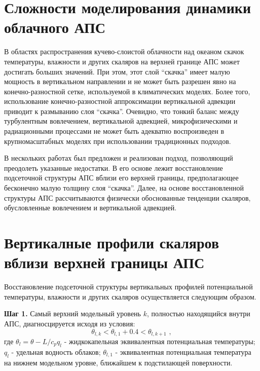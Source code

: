 \documentclass[12pt]{article}
\begin{document}
\section{Сложности моделирования динамики облачного АПС}

В областях распространения кучево-слоистой облачности над океаном скачок температуры, влажности и других скаляров на верхней границе АПС может достигать больших значений. При этом, этот слой ``скачка'' имеет малую мощность в вертикальном направлении и не может быть разрешен явно на конечно-разностной сетке, используемой в климатических моделях. Более того, использование конечно-разностной аппроксимации вертикальной адвекции приводит к размыванию слоя ``скачка''. Очевидно, что тонкий баланс между турбулентным вовлечением, вертикальной адвекцией, микрофизическими и радиационными процессами не может быть адекватно воспроизведен в крупномасштабных моделях при использовании традиционных подходов.

В нескольких работах был предложен и реализован подход, позволяющий преодолеть указанные недостатки. В его основе лежит восстановление подсеточной структуры АПС вблизи его верхней границы, предполагающее бесконечно малую толщину слоя ``скачка''. Далее, на основе восстановленной структуры АПС рассчитываются физически обоснованные тенденции скаляров, обусловленные вовлечением и вертикальной адвекцией.

\section{Вертикалные профили скаляров вблизи верхней границы АПС}

Восстановление подсеточной структуры вертикальных профилей потенциальной температуры, влажности и других скаляров осуществляется следующим образом. 

{\bf Шаг 1.} Самый верхний модельный уровень $k$, полностью находящийся внутри АПС, диагносцируется исходя из условия:
\begin{equation}
\theta_{l,k} < \theta_{l,1} + 0.4 < \theta_{l,k+1}\,\, ,
\end{equation}
где $\theta_l = \theta - L/c_p q_l$ - жидкокапельная эквивалентная потенциальная температуры; $q_l$ - удельная водность облаков; $\theta_{l,1}$ - эквивалентная потенциальная температура на нижнем модельном уровне, ближайшем к подстилающей поверхности.
\end{document}
